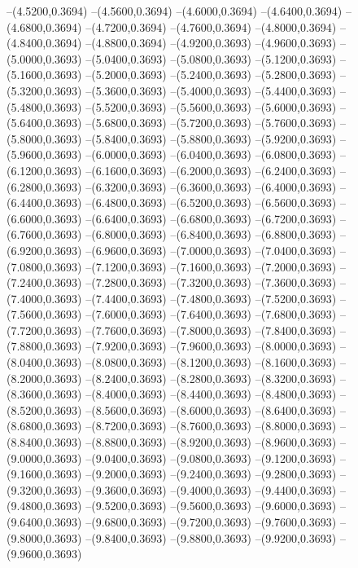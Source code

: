 {	--(4.5200,0.3694)
	--(4.5600,0.3694)
	--(4.6000,0.3694)
	--(4.6400,0.3694)
	--(4.6800,0.3694)
	--(4.7200,0.3694)
	--(4.7600,0.3694)
	--(4.8000,0.3694)
	--(4.8400,0.3694)
	--(4.8800,0.3694)
	--(4.9200,0.3693)
	--(4.9600,0.3693)
	--(5.0000,0.3693)
	--(5.0400,0.3693)
	--(5.0800,0.3693)
	--(5.1200,0.3693)
	--(5.1600,0.3693)
	--(5.2000,0.3693)
	--(5.2400,0.3693)
	--(5.2800,0.3693)
	--(5.3200,0.3693)
	--(5.3600,0.3693)
	--(5.4000,0.3693)
	--(5.4400,0.3693)
	--(5.4800,0.3693)
	--(5.5200,0.3693)
	--(5.5600,0.3693)
	--(5.6000,0.3693)
	--(5.6400,0.3693)
	--(5.6800,0.3693)
	--(5.7200,0.3693)
	--(5.7600,0.3693)
	--(5.8000,0.3693)
	--(5.8400,0.3693)
	--(5.8800,0.3693)
	--(5.9200,0.3693)
	--(5.9600,0.3693)
	--(6.0000,0.3693)
	--(6.0400,0.3693)
	--(6.0800,0.3693)
	--(6.1200,0.3693)
	--(6.1600,0.3693)
	--(6.2000,0.3693)
	--(6.2400,0.3693)
	--(6.2800,0.3693)
	--(6.3200,0.3693)
	--(6.3600,0.3693)
	--(6.4000,0.3693)
	--(6.4400,0.3693)
	--(6.4800,0.3693)
	--(6.5200,0.3693)
	--(6.5600,0.3693)
	--(6.6000,0.3693)
	--(6.6400,0.3693)
	--(6.6800,0.3693)
	--(6.7200,0.3693)
	--(6.7600,0.3693)
	--(6.8000,0.3693)
	--(6.8400,0.3693)
	--(6.8800,0.3693)
	--(6.9200,0.3693)
	--(6.9600,0.3693)
	--(7.0000,0.3693)
	--(7.0400,0.3693)
	--(7.0800,0.3693)
	--(7.1200,0.3693)
	--(7.1600,0.3693)
	--(7.2000,0.3693)
	--(7.2400,0.3693)
	--(7.2800,0.3693)
	--(7.3200,0.3693)
	--(7.3600,0.3693)
	--(7.4000,0.3693)
	--(7.4400,0.3693)
	--(7.4800,0.3693)
	--(7.5200,0.3693)
	--(7.5600,0.3693)
	--(7.6000,0.3693)
	--(7.6400,0.3693)
	--(7.6800,0.3693)
	--(7.7200,0.3693)
	--(7.7600,0.3693)
	--(7.8000,0.3693)
	--(7.8400,0.3693)
	--(7.8800,0.3693)
	--(7.9200,0.3693)
	--(7.9600,0.3693)
	--(8.0000,0.3693)
	--(8.0400,0.3693)
	--(8.0800,0.3693)
	--(8.1200,0.3693)
	--(8.1600,0.3693)
	--(8.2000,0.3693)
	--(8.2400,0.3693)
	--(8.2800,0.3693)
	--(8.3200,0.3693)
	--(8.3600,0.3693)
	--(8.4000,0.3693)
	--(8.4400,0.3693)
	--(8.4800,0.3693)
	--(8.5200,0.3693)
	--(8.5600,0.3693)
	--(8.6000,0.3693)
	--(8.6400,0.3693)
	--(8.6800,0.3693)
	--(8.7200,0.3693)
	--(8.7600,0.3693)
	--(8.8000,0.3693)
	--(8.8400,0.3693)
	--(8.8800,0.3693)
	--(8.9200,0.3693)
	--(8.9600,0.3693)
	--(9.0000,0.3693)
	--(9.0400,0.3693)
	--(9.0800,0.3693)
	--(9.1200,0.3693)
	--(9.1600,0.3693)
	--(9.2000,0.3693)
	--(9.2400,0.3693)
	--(9.2800,0.3693)
	--(9.3200,0.3693)
	--(9.3600,0.3693)
	--(9.4000,0.3693)
	--(9.4400,0.3693)
	--(9.4800,0.3693)
	--(9.5200,0.3693)
	--(9.5600,0.3693)
	--(9.6000,0.3693)
	--(9.6400,0.3693)
	--(9.6800,0.3693)
	--(9.7200,0.3693)
	--(9.7600,0.3693)
	--(9.8000,0.3693)
	--(9.8400,0.3693)
	--(9.8800,0.3693)
	--(9.9200,0.3693)
	--(9.9600,0.3693)
}
